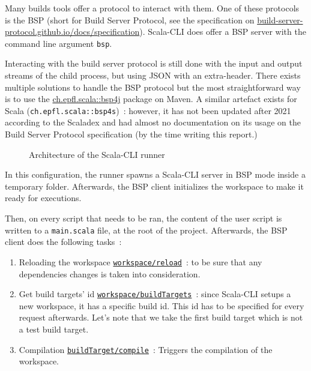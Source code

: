\documentclass{article}
\begin{document}
Many builds tools offer a protocol to interact with them. One of these protocols is the BSP (short for Build Server Protocol, see the specification on \href{https://build-server-protocol.github.io/docs/specification}{build-server-protocol.github.io/docs/specification}). Scala-CLI does offer a BSP server with the command line argument \lstinline{bsp}.

Interacting with the build server protocol is still done with the input and output streams of the child process, but using JSON with an extra-header. There exists multiple solutions to handle the BSP protocol but the most straightforward way is to use the \href{https://mvnrepository.com/artifact/ch.epfl.scala/bsp4j}{ch.epfl.scala::bsp4j} package on Maven. A similar artefact exists for Scala (\lstinline{ch.epfl.scala::bsp4s})~: however, it has not been updated after 2021 according to the Scaladex and had almost no documentation on its usage on the Build Server Protocol specification (by the time writing this report.)

\begin{figure}[h!]
    \centering
    
    \caption{Architecture of the Scala-CLI runner}
\end{figure}

In this configuration, the runner spawns a Scala-CLI server in BSP mode inside a temporary folder. Afterwards, the BSP client initializes the workspace to make it ready for executions.

Then, on every script that needs to be ran, the content of the user script is written to a \lstinline{main.scala} file, at the root of the project. Afterwards, the BSP client does the following tasks~:

\begin{enumerate}
    \item Reloading the workspace \href{https://build-server-protocol.github.io/docs/specification#reload-request}{\lstinline{workspace/reload}}~: to be sure that any dependencies changes is taken into consideration.
    \item Get build targets' id \href{https://build-server-protocol.github.io/docs/specification#workspace-build-targets-request}{\lstinline{workspace/buildTargets}}~: since Scala-CLI setups a new workspace, it has a specific build id. This id has to be specified for every request afterwards. Let's note that we take the first build target which is not a test build target.
    \item Compilation \href{https://build-server-protocol.github.io/docs/specification#compile-request}{\lstinline{buildTarget/compile}}~: Triggers the compilation of the workspace.
\end{enumerate}
\end{document}
